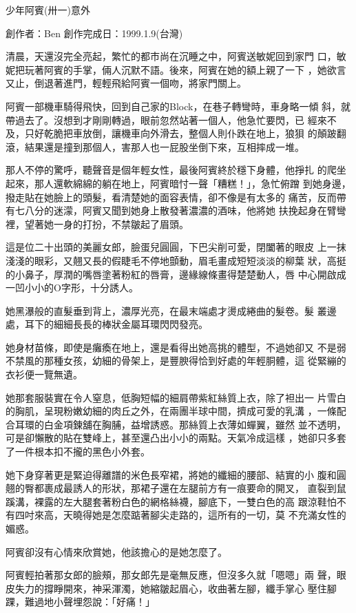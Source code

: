 



少年阿賓(卅一)意外

創作者：Ben
創作完成日：1999.1.9(台灣)


清晨，天還沒完全亮起，繁忙的都市尚在沉睡之中，阿賓送敏妮回到家門
口，敏妮把玩著阿賓的手掌，倆人沉默不語。後來，阿賓在她的額上親了一下
，她欲言又止，倒退著進門，輕輕飛給阿賓一個吻，將家門關上。

阿賓一部機車騎得飛快，回到自己家的Block，在巷子轉彎時，車身略一傾
斜，就帶過去了。沒想到才剛剛轉過，眼前忽然站著一個人，他急忙要閃，已
經來不及，只好乾脆把車放倒，讓機車向外滑去，整個人則仆跌在地上，狼狽
的顛跛翻滾，結果還是撞到那個人，害那人也一屁股坐倒下來，互相摔成一堆。

那人不停的驚呼，聽聲音是個年輕女性，最後阿賓終於穩下身體，他掙扎
的爬坐起來，那人還軟綿綿的躺在地上，阿賓暗忖一聲「糟糕！」，急忙俯蹭
到她身邊，撥走貼在她臉上的頭髮，看清楚她的面容表情，卻不像是有太多的
痛苦，反而帶有七八分的迷濛，阿賓又聞到她身上散發著濃濃的酒味，他將她
扶挽起身在臂彎裡，望著她一身的打扮，不禁皺起了眉頭。

這是位二十出頭的美麗女郎，臉蛋兒圓圓，下巴尖削可愛，閉闔著的眼皮
上一抹淺淺的眼彩，又翹又長的假睫毛不停地顫動，眉毛畫成短短淡淡的柳葉
狀，高挺的小鼻子，厚潤的嘴唇塗著粉紅的唇膏，邊緣線條畫得楚楚動人，唇
中心開啟成一凹小小的O字形，十分誘人。

她黑瀑般的直髮垂到背上，濃厚光亮，在最末端處才燙成綣曲的髮卷。髮
叢邊處，耳下的細細長長的棒狀金屬耳環閃閃發亮。

她身材苗條，即使是癱瘓在地上，還是看得出她高挑的體型，不過她卻又
不是弱不禁風的那種女孩，幼細的骨架上，是豐腴得恰到好處的年輕胴體，這
從緊繃的衣衫便一覽無遺。

她那套服裝實在令人窒息，低胸短幅的細肩帶紫紅絲質上衣，除了袒出一
片雪白的胸肌，呈現粉嫩幼細的肉丘之外，在兩團半球中間，擠成可愛的乳溝
，一條配合耳環的白金項鍊舖在胸脯，益增誘惑。那絲質上衣薄如蟬翼，雖然
並不透明，可是卻懶散的貼在雙峰上，甚至還凸出小小的兩點。天氣冷成這樣
，她卻只多套了一件根本扣不攏的黑色小外套。

她下身穿著更是緊迫得離譜的米色長窄裙，將她的纖細的腰部、結實的小
腹和圓翹的臀都裹成最誘人的形狀，那裙子還在左腿前方有一痕要命的開叉，
直裂到鼠蹊溝，裸露的左大腿套著粉白色的網格絲襪，腳底下，一雙白色的高
跟涼鞋怕不有四吋來高，天曉得她是怎麼踮著腳尖走路的，這所有的一切，莫
不充滿女性的媚惑。

阿賓卻沒有心情來欣賞她，他該擔心的是她怎麼了。

阿賓輕拍著那女郎的臉頰，那女郎先是毫無反應，但沒多久就「嗯嗯」兩
聲，眼皮失力的撐睜開來，神采渾濁，她縮皺起眉心，收曲著左腳，纖手掌心
壓住腳踝，難過地小聲埋怨說：「好痛！」

